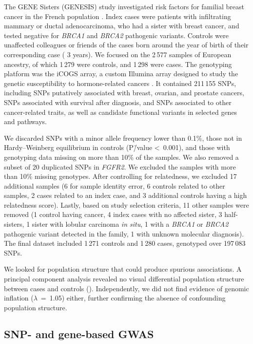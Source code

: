 \documentclass[10pt,letterpaper]{article}
\begin{document}
The GENE Sisters (GENESIS) study investigated risk factors for familial breast cancer in the French population \cite{sinilnikova_genesis:_2016}. Index cases were patients with infiltrating mammary or ductal adenocarcinoma, who had a sister with breast cancer, and tested negative for \emph{BRCA1} and \emph{BRCA2} pathogenic variants. Controls were unaffected colleagues or friends of the cases born around the year of birth of their corresponding case (\textpm{} 3 years). We focused on the 2\,577 samples of European ancestry, of which 1\,279 were controls, and 1\,298 were cases. The genotyping platform was the iCOGS array, a custom Illumina array designed to study the genetic susceptibility to hormone-related cancers \cite{sakoda_turning_2013}. It contained 211\,155 SNPs, including SNPs putatively associated with breast, ovarian, and prostate cancers, SNPs associated with survival after diagnosis, and SNPs associated to other cancer-related traits, as well as candidate functional variants in selected genes and pathways.

We discarded SNPs with a minor allele frequency lower than 0.1\%, those not in Hardy--Weinberg equilibrium in controls (P\=/value \textless~0.001), and those with genotyping data missing on more than 10\% of the samples. We also removed a subset of 20 duplicated SNPs in \emph{FGFR2}. We excluded the samples with more than 10\% missing genotypes. After controlling for relatedness, we excluded 17 additional samples (6 for sample identity error, 6 controls related to other samples, 2 cases related to an index case, and 3 additional controls having a high relatedness score). Lastly, based on study selection criteria, 11 other samples were removed (1 control having cancer, 4 index cases with no affected sister, 3 half-sisters, 1 sister with lobular carcinoma \emph{in situ}, 1 with a \emph{BRCA1} or \emph{BRCA2} pathogenic variant detected in the family, 1 with unknown molecular diagnosis). The final dataset included 1\,271 controls and 1\,280 cases, genotyped over 197\,083 SNPs. 

We looked for population structure that could produce spurious associations. A principal component analysis revealed no visual differential population structure between cases and controls (). Independently, we did not find evidence of genomic inflation (\(\lambda\)~=~1.05) either, further confirming the absence of confounding population structure.

\subsection{SNP- and gene-based GWAS}
\label{methods:conventional}
\end{document}
